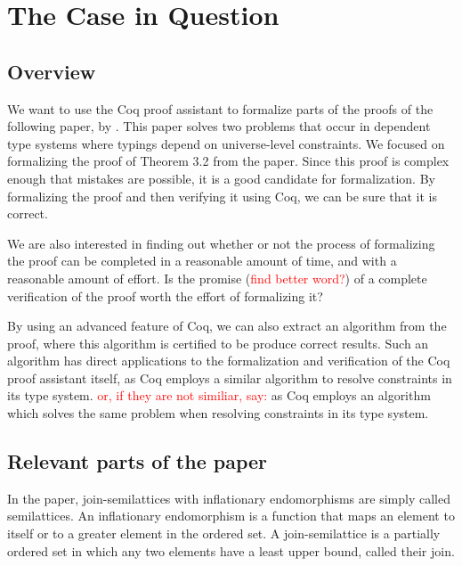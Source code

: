 \chapter{The Case in Question}
\label{ch:the_case_in_question}

\section{Overview}
\label{sec:overview}

We want to use the Coq proof assistant to formalize parts of the proofs of the following paper, by \citeauthor{mbezem} \cite{mbezem}.
This paper solves two problems that occur in dependent type systems where typings depend
on universe-level constraints. We focused on formalizing the proof of Theorem 3.2 from the paper.
Since this proof is complex enough that mistakes are possible, it is a good candidate for formalization.
By formalizing the proof and then verifying it using Coq, we can be sure that it is correct.

We are also interested in finding out whether or not the process of formalizing the proof
can be completed in a reasonable amount of time, and with a reasonable amount of effort.
Is the promise (\textcolor{red}{find better word?}) of a complete verification of the proof worth the effort of formalizing it?

By using an advanced feature of Coq, we can also extract an algorithm from the proof,
where this algorithm is certified to be produce correct results.
Such an algorithm has direct applications to the formalization and verification of the Coq proof assistant itself,
as Coq employs a similar algorithm to resolve constraints in its type system.
\textcolor{red}{or, if they are not similiar, say:}
as Coq employs an algorithm which solves the same problem when resolving constraints in its type system.

\section{Relevant parts of the paper}
\label{sec:relevant_parts_of_the_paper}

In the paper, join-semilattices with inflationary endomorphisms
are simply called semilattices. An inflationary endomorphism is a function
that maps an element to itself or to a greater element in the ordered set.
A join-semilattice is a partially ordered set in which any two elements have a least upper bound,
called their join.

